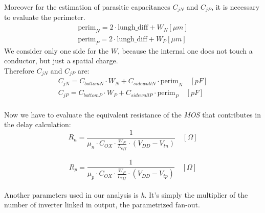 \documentclass[12pt,  english, makeidx, a4paper, titlepage, oneside]{article}
\begin{document}
Moreover for the estimation of parasitic capacitances $C_{jN}$ and $C_{jP}$, it is necessary to evaluate the perimeter.
\begin{eqnarray}
\text{perim}_N=2 \cdot \text{lungh\_diff} + W_N [\mu m]\\
\text{perim}_P=2 \cdot \text{lungh\_diff} + W_P [\mu m]
\end{eqnarray}
We consider only one side for the $W$, because the internal one does not touch a conductor, but just a spatial charge. \\Therefore $C_{jN}$ and $C_{jP}$ are:
\begin{eqnarray}
C_{jN}=C_{bottomN} \cdot W_N + C_{sidewallN} \cdot \text{perim}_N \quad [pF]\\
C_{jP}=C_{bottomP} \cdot W_P + C_{sidewallP} \cdot \text{perim}_P \quad [pF]
\end{eqnarray}
\\ Now we have to evaluate the equivalent resistance of the \textit{MOS} that contributes in the delay calculation:
\begin{equation}
R_n=\frac{1}{\mu_n \cdot C_{OX} \cdot \frac{W_N}{L_{eff}}\cdot (V_{DD}-V_{tn})} \quad [\Omega]
\end{equation}\\
\begin{equation}
R_p=\frac{1}{\mu_p \cdot C_{OX} \cdot \frac{W_P}{L_{eff}}\cdot (V_{DD}-V_{tp})} \quad [\Omega]
\end{equation}\\
Another parameters used in our analysis is \textit{h}. It's simply the multiplier of the number of inverter linked in output, the parametrized fan-out.
\end{document}
